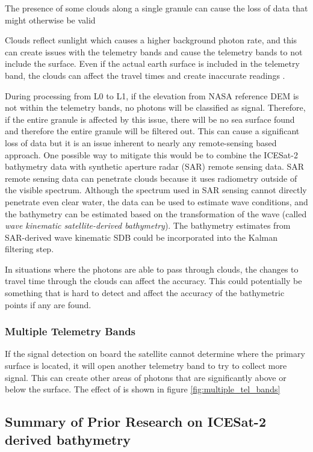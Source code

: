 The presence of some clouds along a single granule can cause the loss of data that might otherwise be valid

Clouds reflect sunlight which causes a higher background photon rate, and this can create issues with the telemetry bands and cause the telemetry bands to not include the surface. Even if the actual earth surface is included in the telemetry band, the clouds can affect the travel times and create inaccurate readings \parencite{atl03knownissues}.

During processing from L0 to L1, if the elevation from NASA reference DEM is not within the telemetry bands, no photons will be classified as signal. Therefore, if the entire granule is affected by this issue, there will be no sea surface found and therefore the entire granule will be filtered out. This can cause a significant loss of data but it is an issue inherent to nearly any remote-sensing based approach. One possible way to mitigate this would be to combine the ICESat-2 bathymetry data with synthetic aperture radar (SAR) remote sensing data. SAR remote sensing data can penetrate clouds because it uses radiometry outside of the visible spectrum. Although the spectrum used in SAR sensing cannot directly penetrate even clear water, the data can be used to estimate wave conditions, and the bathymetry can be estimated based on the transformation of the wave (called \emph{wave kinematic satellite-derived bathymetry}). The bathymetry estimates from SAR-derived wave kinematic SDB could be incorporated into the Kalman filtering step. 

In situations where the photons are able to pass through clouds, the changes to travel time through the clouds can affect the accuracy. This could potentially be something that is hard to detect and affect the accuracy of the bathymetric points if any are found.
 

\subsubsection{Multiple Telemetry Bands}

If the signal detection on board the satellite cannot determine where the primary surface is located, it will open another telemetry band to try to collect more signal. This can create other areas of photons that are significantly above or below the surface. The effect of is shown in figure \ref{fig:multiple_tel_bands}


\subsection{Summary of Prior Research on ICESat-2 derived bathymetry} %

